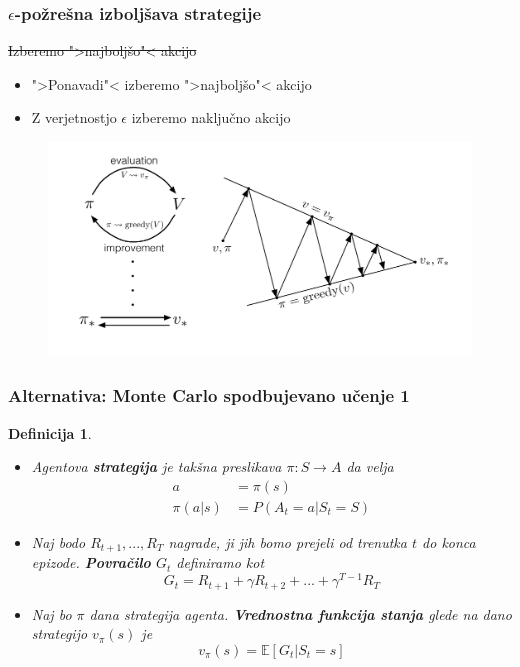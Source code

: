 \documentclass{beamer}    %
\newtheorem{definicija}[izrek]{Definicija}
\begin{document}
\begin{frame}
    \frametitle{$\epsilon$-požrešna izboljšava strategije}
    \pause
    \sout{Izberemo ">najboljšo"< akcijo}
    \pause
    \medskip

    \begin{itemize}
        \item ">Ponavadi"< izberemo ">najboljšo"< akcijo
        \item Z verjetnostjo $\epsilon$ izberemo naključno akcijo
    \end{itemize}

    \begin{figure}
        \includegraphics[scale=0.23]{slike/policy-iteration.png}
    \end{figure}
\end{frame}


\begin{frame}
    \frametitle{Alternativa: Monte Carlo spodbujevano učenje 1}
    \begin{definicija}
        \begin{itemize}
            \item Agentova \textbf{strategija} je takšna preslikava $\pi: S \rightarrow A$
                    da velja 
                    \begin{align*}
                    a &= \pi(s) \\
                    \pi(a | s) &= P(A_t = a | S_t = S) 
                    \end{align*}

            \item Naj bodo $R_{t+1}, ...,R_T$ nagrade, ji jih bomo prejeli od trenutka 
                    $t$ do konca epizode. \textbf{Povračilo} $G_t$ definiramo kot
                    $$
                    G_t = R_{t+1} + \gamma R_{t+2} + ... + \gamma^{T-1} R_T
                    $$

            \item Naj bo $\pi$ dana strategija agenta. \textbf{Vrednostna funkcija 
                    stanja} glede na dano strategijo $v_\pi(s)$ je
                    $$
                    v_\pi(s) = \mathbb{E} [G_t | S_t = s]
                    $$
        \end{itemize}
    \end{definicija}
\end{frame}
\end{document}
